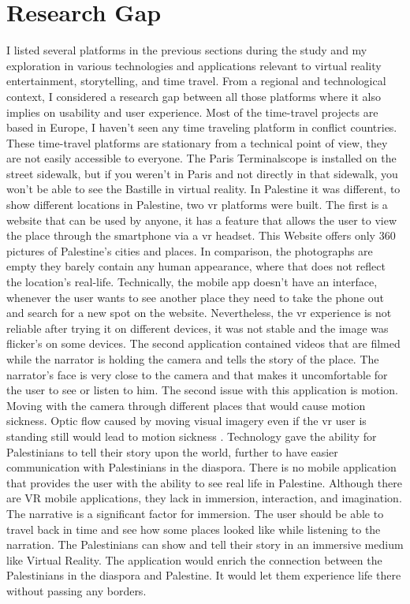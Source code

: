 \section{Research Gap}

I listed several platforms in the previous sections during the study and my exploration in various technologies and applications relevant to virtual reality entertainment, storytelling, and time travel. From a regional and technological context, I considered a research gap between all those platforms where it also implies on usability and user experience. Most of the time-travel projects are based in Europe, I haven't seen any time traveling platform in conflict countries. These time-travel platforms are stationary from a technical point of view, they are not easily accessible to everyone. The Paris Terminalscope is installed on the street sidewalk, but if you weren't in Paris and not directly in that sidewalk, you won't be able to see the Bastille in virtual reality. In Palestine it was different, to show different locations in Palestine, two \acrshort{vr} platforms were built. The first is a website that can be used by anyone, it has a feature that allows the user to view the place through the smartphone via a \acrshort{vr} headset. This Website offers only 360 pictures of Palestine's cities and places. In comparison, the photographs are empty they barely contain any human appearance, where that does not reflect the location's real-life. Technically, the mobile app doesn't have an interface, whenever the user wants to see another place they need to take the phone out and search for a new spot on the website. Nevertheless, the \acrshort{vr} experience is not reliable after trying it on different devices, it was not stable and the image was flicker's on some devices. The second application contained videos that are filmed while the narrator is holding the camera and tells the story of the place. The narrator's face is very close to the camera and that makes it uncomfortable for the user to see or listen to him. The second issue with this application is motion. Moving with the camera through different places that would cause motion sickness. Optic flow caused by moving visual imagery even if the \acrshort{vr} user is standing still would lead to motion sickness \citep{Steinicke2016}. 
Technology gave the ability for Palestinians to tell their story upon the world, further to have easier communication with Palestinians in the diaspora. There is no mobile application that provides the user with the ability to see real life in Palestine. Although there are VR mobile applications, they lack in immersion, interaction, and imagination. The narrative is a significant factor for immersion. The user should be able to travel back in time and see how some places looked like while listening to the narration. The Palestinians can show and tell their story in an immersive medium like Virtual Reality. The application would enrich the connection between the Palestinians in the diaspora and Palestine. It would let them experience life there without passing any borders.
 

